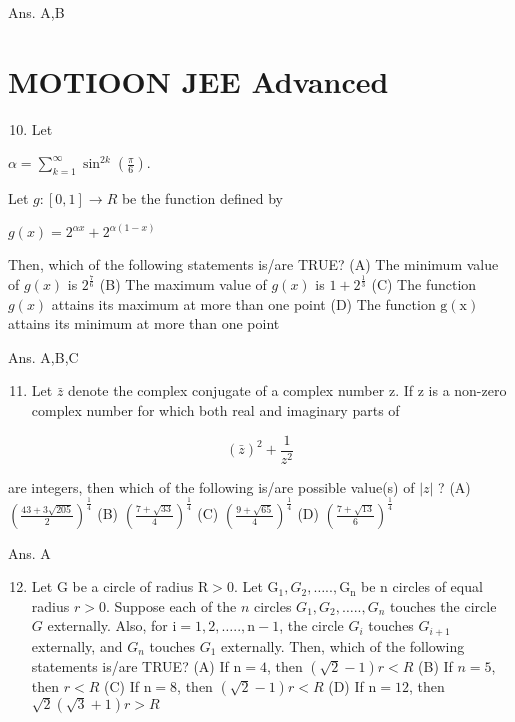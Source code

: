 \documentclass[10pt]{article}
\begin{document}
Ans. A,B

\section{MOTIOON JEE Advanced}
\begin{enumerate}
  \setcounter{enumi}{9}
  \item Let
\end{enumerate}

$\alpha=\sum_{k=1}^{\infty} \sin ^{2 k}\left(\frac{\pi}{6}\right)$.

Let $g:[0,1] \rightarrow R$ be the function defined by

$g(x)=2^{\alpha x}+2^{\alpha(1-x)}$

Then, which of the following statements is/are TRUE?
(A) The minimum value of $g(x)$ is $2^{\frac{7}{6}}$
(B) The maximum value of $g(x)$ is $1+2^{\frac{1}{3}}$
(C) The function $g(x)$ attains its maximum at more than one point
(D) The function $\mathrm{g}(\mathrm{x})$ attains its minimum at more than one point

Ans. A,B,C

\begin{enumerate}
  \setcounter{enumi}{10}
  \item Let $\bar{z}$ denote the complex conjugate of a complex number $\mathrm{z}$. If $\mathrm{z}$ is a non-zero complex number for which both real and imaginary parts of
\end{enumerate}

$$
(\bar{z})^{2}+\frac{1}{z^{2}}
$$

are integers, then which of the following is/are possible value(s) of $|z|$ ?
(A) $\left(\frac{43+3 \sqrt{205}}{2}\right)^{\frac{1}{4}}$
(B) $\left(\frac{7+\sqrt{33}}{4}\right)^{\frac{1}{4}}$
(C) $\left(\frac{9+\sqrt{65}}{4}\right)^{\frac{1}{4}}$
(D) $\left(\frac{7+\sqrt{13}}{6}\right)^{\frac{1}{4}}$

Ans. A

\begin{enumerate}
  \setcounter{enumi}{11}
  \item Let $\mathrm{G}$ be a circle of radius $\mathrm{R}>0$. Let $\mathrm{G}_{1}, G_{2}, \ldots . ., \mathrm{G}_{\mathrm{n}}$ be $\mathrm{n}$ circles of equal radius $r>0$. Suppose each of the $n$ circles $G_{1}, G_{2}, \ldots . ., G_{n}$ touches the circle $G$ externally. Also, for $\mathrm{i}=1,2, \ldots . ., \mathrm{n}-1$, the circle $G_{i}$ touches $G_{i+1}$ externally, and $G_{n}$ touches $G_{1}$ externally. Then, which of the following statements is/are TRUE?
(A) If $\mathrm{n}=4$, then $(\sqrt{2}-1) r<R$
(B) If $n=5$, then $r<R$
(C) If $\mathrm{n}=8$, then $(\sqrt{2}-1) r<R$
(D) If $\mathrm{n}=12$, then $\sqrt{2}(\sqrt{3}+1) r>R$
\end{enumerate}
\end{document}
